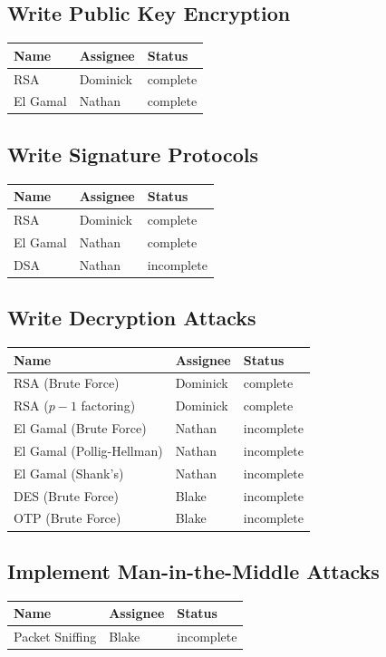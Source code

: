 \documentclass[12pt]{report}
\begin{document}
    \subsection{Write Public Key Encryption}
    \begin{tabular}{l|l|l}
        Name & Assignee & Status \\ \hline
        RSA & Dominick & complete \\
        El Gamal & Nathan & complete
    \end{tabular}

    \subsection{Write Signature Protocols}
    \begin{tabular}{l|l|l}
        Name & Assignee & Status \\ \hline
        RSA & Dominick & complete \\
        El Gamal & Nathan & complete \\
        DSA & Nathan & incomplete	 
    \end{tabular}

    \subsection{Write Decryption Attacks}
    \begin{tabular}{l|l|l}
        Name & Assignee & Status \\ \hline
        RSA (Brute Force) & Dominick & complete \\
        RSA ($p-1$ factoring) & Dominick & complete \\
        El Gamal (Brute Force) & Nathan & incomplete \\
        El Gamal (Pollig-Hellman) & Nathan & incomplete \\
        El Gamal (Shank's) & Nathan & incomplete \\
        DES (Brute Force) & Blake & incomplete \\
        OTP (Brute Force) & Blake & incomplete 
    \end{tabular}

    \subsection{Implement Man-in-the-Middle Attacks}
    \begin{tabular}{l|l|l}
        Name & Assignee & Status \\ \hline
        Packet Sniffing & Blake & incomplete 
    \end{tabular}
\end{document}
